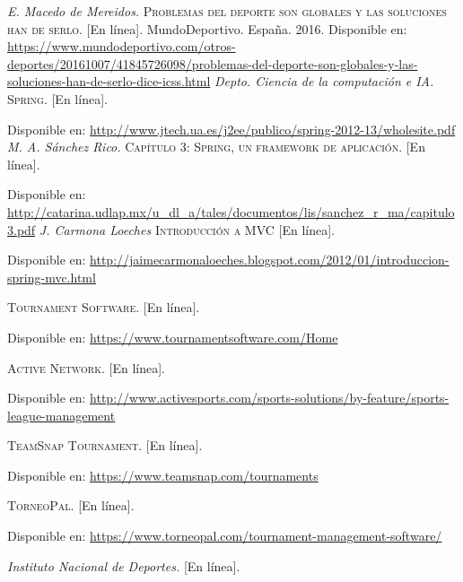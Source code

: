 \begin{thebibliography}{}
	\textit{E. Macedo de Mereidos.}
	\textsc{Problemas del deporte son globales y las soluciones han de serlo.} [En línea]. 
	MundoDeportivo. España. 2016.
	Disponible en: 
	\url{https://www.mundodeportivo.com/otros-deportes/20161007/41845726098/problemas-del-deporte-son-globales-y-las-soluciones-han-de-serlo-dice-icss.html}
	\textit{Depto. Ciencia de la computación e IA.}
	\textsc{Spring.} [En línea]. 
	
	Disponible en:
	\url{http://www.jtech.ua.es/j2ee/publico/spring-2012-13/wholesite.pdf}
	\textit{M. A. Sánchez Rico.}
	\textsc{Capítulo 3: Spring, un framework de aplicación.} [En línea].
	
	Disponible en:
	\url{http://catarina.udlap.mx/u_dl_a/tales/documentos/lis/sanchez_r_ma/capitulo3.pdf}
	\textit{J. Carmona Loeches}
	\textsc{Introducción a MVC} [En línea]. 
	
	Disponible en: 
	\url{http://jaimecarmonaloeches.blogspot.com/2012/01/introduccion-spring-mvc.html}
	
	\textit{}
	\textsc{Tournament Software.} [En línea].
	
	Disponible en: 
	\url{https://www.tournamentsoftware.com/Home}
	
	\textit{}
	\textsc{Active Network.} [En línea].
	
	Disponible en: 
	\url{http://www.activesports.com/sports-solutions/by-feature/sports-league-management}
	
	\textit{}
	\textsc{TeamSnap Tournament.} [En línea].
	
	Disponible en:
	\url{https://www.teamsnap.com/tournaments}
	
	\textit{}
	\textsc{TorneoPal.} [En línea].
	
	Disponible en: 
	\url{ https://www.torneopal.com/tournament-management-software/}
	
	\textit{Instituto Nacional de Deportes.}
	\textsc{}[En línea].
	

\end{thebibliography}
